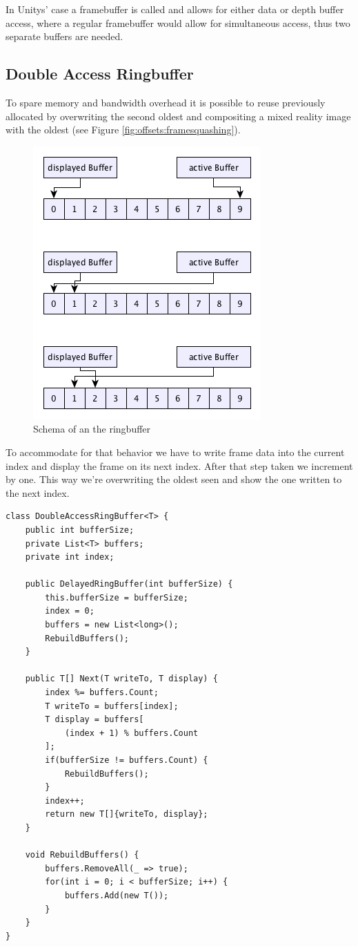 
In Unitys' case a framebuffer is called  and allows 
for either data or depth buffer access, where a regular framebuffer would allow 
for simultaneous access, thus two separate buffers are needed.

\subsection{Double Access Ringbuffer}

To spare memory and bandwidth overhead it is possible to reuse previously 
allocated  by overwriting the second oldest 
 and compositing a mixed reality image with the oldest 
(see  Figure \ref{fig:offsets:framesquashing}).

\begin{figure}[htb]
	\centering
	\includegraphics[width=.5\textwidth]{gfx/ringbuffer_schematics.png}
	\caption{Schema of an the ringbuffer}
	\label{fig:offsets:ringbuffer}
\end{figure}

To accommodate for that behavior we have to write frame data into the  current 
index and display the frame on its next index. After that step taken we 
increment by one. This way we’re overwriting the oldest seen 
 and show the one written to the next index.

\begin{lstlisting}
class DoubleAccessRingBuffer<T> {
	public int bufferSize;
	private List<T> buffers;
	private int index;
	
	public DelayedRingBuffer(int bufferSize) {
		this.bufferSize = bufferSize;
		index = 0;
		buffers = new List<long>();
		RebuildBuffers();
	}
	
	public T[] Next(T writeTo, T display) {
		index %= buffers.Count;
		T writeTo = buffers[index];
		T display = buffers[
			(index + 1) % buffers.Count
		];
		if(bufferSize != buffers.Count) {
			RebuildBuffers();
		}
		index++;
		return new T[]{writeTo, display};
	}
	
	void RebuildBuffers() {
		buffers.RemoveAll(_ => true);
		for(int i = 0; i < bufferSize; i++) {
			buffers.Add(new T());
		}
	}
}
\end{lstlisting}

